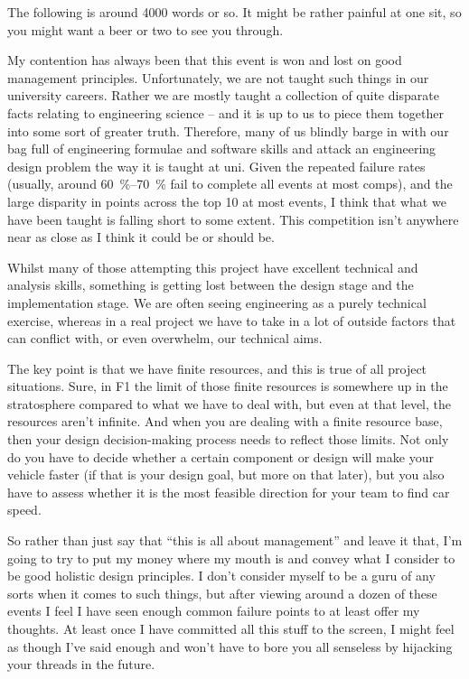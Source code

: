 \documentclass[10pt, a4paper, article, oneside, twocolumn, final]{memoir}
\begin{document}
The following is around \num{4000} words or so. It might be rather painful at one sit, so you might want a beer or two to see you through. 

My contention has always been that this event is won and lost on good management principles. Unfortunately, we are not taught such things in our university careers. Rather we are mostly taught a collection of quite disparate facts relating to engineering science -- and it is up to us to piece them together into some sort of greater truth. Therefore, many of us blindly barge in with our bag full of engineering formulae and software skills and attack an engineering design problem the way it is taught at uni. Given the repeated failure rates (usually, around \SIrange{60}{70}{\percent} fail to complete all events at most comps), and the large disparity in points across the top \num{10} at most events, I think that what we have been taught is falling short to some extent. This competition isn’t anywhere near as close as I think it could be or should be.

Whilst many of those attempting this project have excellent technical and analysis skills, something is getting lost between the design stage and the implementation stage. We are often seeing engineering as a purely technical exercise, whereas in a real project we have to take in a lot of outside factors that can conflict with, or even overwhelm, our technical aims. 

The key point is that we have finite resources, and this is true of all project situations. Sure, in F1 the limit of those finite resources is somewhere up in the stratosphere compared to what we have to deal with, but even at that level, the resources aren’t infinite. And when you are dealing with a finite resource base, then your design decision-making process needs to reflect those limits. Not only do you have to decide whether a certain component or design will make your vehicle faster (if that is your design goal, but more on that later), but you also have to assess whether it is the most feasible direction for your team to find car speed.

So rather than just say that “this is all about management” and leave it that, I’m going to try to put my money where my mouth is and convey what I consider to be good holistic design principles. I don’t consider myself to be a guru of any sorts when it comes to such things, but after viewing around a dozen of these events I feel I have seen enough common failure points to at least offer my thoughts. At least once I have committed all this stuff to the screen, I might feel as though I’ve said enough and won’t have to bore you all senseless by hijacking your threads in the future. 
\end{document}
